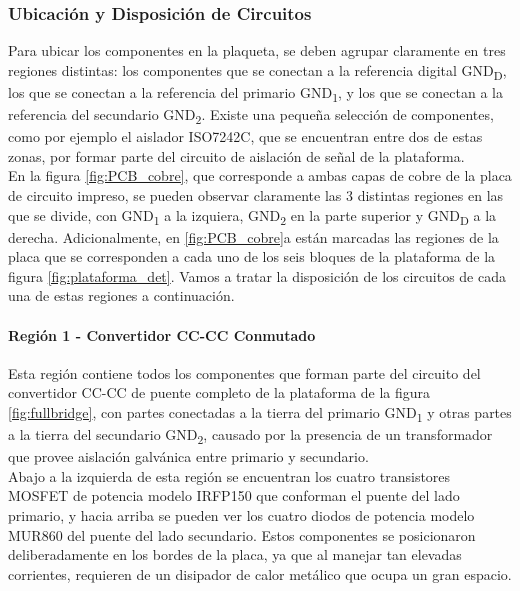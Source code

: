 \subsubsection{Ubicación y Disposición de Circuitos}

Para ubicar los componentes en la plaqueta, se deben agrupar claramente en tres regiones distintas: los componentes que se conectan a la referencia digital GND\textsubscript{D}, los que se conectan a la referencia del primario GND\textsubscript{1}, y los que se conectan a la referencia del secundario GND\textsubscript{2}. Existe una pequeña selección de componentes, como por ejemplo el aislador ISO7242C, que se encuentran entre dos de estas zonas, por formar parte del circuito de aislación de señal de la plataforma.\\ 

En la figura \ref{fig:PCB_cobre}, que corresponde a ambas capas de cobre de la placa de circuito impreso, se pueden observar claramente las 3 distintas regiones en las que se divide, con GND\textsubscript{1} a la izquiera, GND\textsubscript{2} en la parte superior y GND\textsubscript{D} a la derecha. Adicionalmente, en \ref{fig:PCB_cobre}a están marcadas las regiones de la placa que se corresponden a cada uno de los seis bloques de la plataforma de la figura \ref{fig:plataforma_det}. Vamos a tratar la disposición de los circuitos de cada una de estas regiones a continuación.\\

\paragraph{Región 1 - Convertidor CC-CC Conmutado}

Esta región contiene todos los componentes que forman parte del circuito del convertidor CC-CC de puente completo de la plataforma de la figura \ref{fig:fullbridge}, con partes conectadas a la tierra del primario GND\textsubscript{1} y otras partes a la tierra del secundario GND\textsubscript{2}, causado por la presencia de un transformador que provee aislación galvánica entre primario y secundario.\\

Abajo a la izquierda de esta región se encuentran los cuatro transistores MOSFET de potencia modelo IRFP150 que conforman el puente del lado primario, y hacia arriba se pueden ver los cuatro diodos de potencia modelo MUR860 del puente del lado secundario. Estos componentes se posicionaron deliberadamente en los bordes de la placa, ya que al manejar tan elevadas corrientes, requieren de un disipador de calor metálico que ocupa un gran espacio.\\

